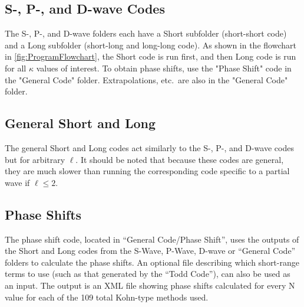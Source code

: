 \documentclass[Dissertation.tex]{subfiles}
\begin{document}
\subsection*{S-, P-, and D-wave Codes}
The S-, P-, and D-wave folders each have a Short subfolder (short-short
code) and a Long subfolder (short-long and long-long code). As shown in
the flowchart in \cref{fig:ProgramFlowchart}, the Short code is run first,
and then Long code is run for all $\kappa$ values of interest.
To obtain phase shifts, use the "Phase Shift" code in the "General Code"
folder. Extrapolations, etc.\ are also in the "General Code" folder.

\subsection*{General Short and Long}
The general Short and Long codes act similarly to the S-, P-, and D-wave
codes but for arbitrary $\ell$. It should be noted that because these
codes are general, they are much slower than running the corresponding
code specific to a partial wave if $\ell \leq 2$.


%
%
%
%
%

\subsection*{Phase Shifts}
The phase shift code, located in ``General Code/Phase Shift'', uses the
outputs of the Short and Long codes from the S-Wave, P-Wave, D-wave or
``General Code'' folders to calculate the phase shifts. An optional file
describing which short-range terms to use (such as that generated by the
``Todd Code''), can also be used as an input. The output is an XML file
showing phase shifts calculated for every N value for each of the 109
total Kohn-type methods used.
\end{document}
